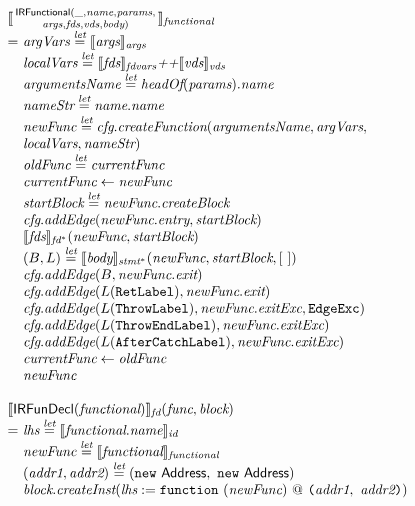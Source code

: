\[
\begin{array}{l@{}l@{~}l}
\lefteqn{\transfun{\irfunctionalsmall{\_}{\emph{name}}{\emph{params}}{\emph{args}}{\emph{fds}}{\emph{vds}}{\emph{body}}}_{\emph{functional}}}\\
& = & \emph{argVars} \letval \transfun{\emph{args}}_{\emph{args}}\\
& & \emph{localVars} \letval \transfun{\emph{fds}}_{\emph{fdvars}} \emph{++} \transfun{\emph{vds}}_{\emph{vds}}\\
& & \emph{argumentsName} \letval \headOf(\emph{params}).\emph{name}\\
& & \emph{nameStr} \letval \emph{name}.\emph{name}\\
& & \emph{newFunc} \letval \emph{cfg}.\emph{createFunction}(\emph{argumentsName}, \emph{argVars},\\
& & \emph{localVars}, \emph{nameStr})\\
& & \emph{oldFunc} \letval \emph{currentFunc}\\
& & \emph{currentFunc} \leftarrow \emph{newFunc}\\
& & \emph{startBlock} \letval \emph{newFunc}.\emph{createBlock}\\
& & \emph{cfg}.\emph{addEdge}(\emph{newFunc}.\emph{entry}, \emph{startBlock})\\
& & \transfun{\emph{fds}}_{\emph{fd}^{*}}(\emph{newFunc}, \emph{startBlock})\\
& & (B, L) \letval \transfun{\emph{body}}_{\emph{stmt}^{*}}(\emph{newFunc}, \emph{startBlock}, [\ ])\\
& & \emph{cfg}.\emph{addEdge}(B, \emph{newFunc}.\emph{exit})\\
& & \emph{cfg}.\emph{addEdge}(L(\TT{RetLabel}), \emph{newFunc}.\emph{exit})\\
& & \emph{cfg}.\emph{addEdge}(L(\TT{ThrowLabel}), \emph{newFunc}.\emph{exitExc}, \EdgeExc)\\
& & \emph{cfg}.\emph{addEdge}(L(\TT{ThrowEndLabel}), \emph{newFunc}.\emph{exitExc})\\
& & \emph{cfg}.\emph{addEdge}(L(\TT{AfterCatchLabel}), \emph{newFunc}.\emph{exitExc})\\
& & \emph{currentFunc} \leftarrow \emph{oldFunc}\\
& & \emph{newFunc}\\
& & \\
\lefteqn{\transfun{\IRFunDecl(\emph{functional})}_{\emph{fd}}(\emph{func}, \emph{block})}\\
& = & \emph{lhs} \letval \transfun{\emph{functional}.\emph{name}}_{\emph{id}}\\
& & \emph{newFunc} \letval \transfun{\emph{functional}}_{\emph{functional}}\\
& & (\emph{addr1}, \emph{addr2}) \letval (\new\ \Address,\ \new\ \Address)\\
& & \emph{block}.\emph{createInst}(\emph{lhs} := \TT{function}\ (\emph{newFunc}) ~@~
\TT{(}\emph{addr1},\ \emph{addr2}\TT{)})\\
& & \\


\end{array}\]
